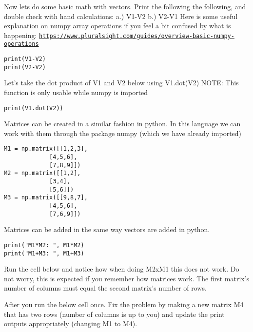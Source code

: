 \documentclass[%
oneside,                 %
final,                   %
10pt]{article}
\begin{document}
Now lets do some basic math with vectors. Print the following the following, and double check with hand calculations:
a.) V1-V2    b.) V2-V1  
Here is some useful explanation on numpy array operations if you feel a bit confused by what is happening: \href{{https://www.pluralsight.com/guides/overview-basic-numpy-operations}}{\nolinkurl{https://www.pluralsight.com/guides/overview-basic-numpy-operations}}

\begin{verbatim}
print(V1-V2)
print(V2-V2)
\end{verbatim}

Let's take the dot product of V1 and V2 below using V1.dot(V2)
NOTE: This function is only usable while numpy is imported


\begin{verbatim}
print(V1.dot(V2))
\end{verbatim}

Matrices can be created in a similar fashion in python.  In this language we can work with them through the package numpy (which we have already imported)


\begin{verbatim}
M1 = np.matrix([[1,2,3],
             [4,5,6],
             [7,8,9]])
M2 = np.matrix([[1,2],
             [3,4],
             [5,6]])
M3 = np.matrix([[9,8,7],
             [4,5,6],
             [7,6,9]])
\end{verbatim}

Matrices can be added in the same way vectors are added in python.


\begin{verbatim}
print("M1*M2: ", M1*M2)
print("M1+M3: ", M1+M3)
\end{verbatim}

Run the cell below and notice how when doing M2xM1 this does not work. Do not worry, this is expected if you remember how matrices work. The first matrix's number of columns must equal the second matrix's number of rows. 

After you run the below cell once. Fix the problem by making a new matrix M4 that has two rows (number of columns is up to you) and update the print outputs appropriately (changing M1 to M4).
\end{document}
